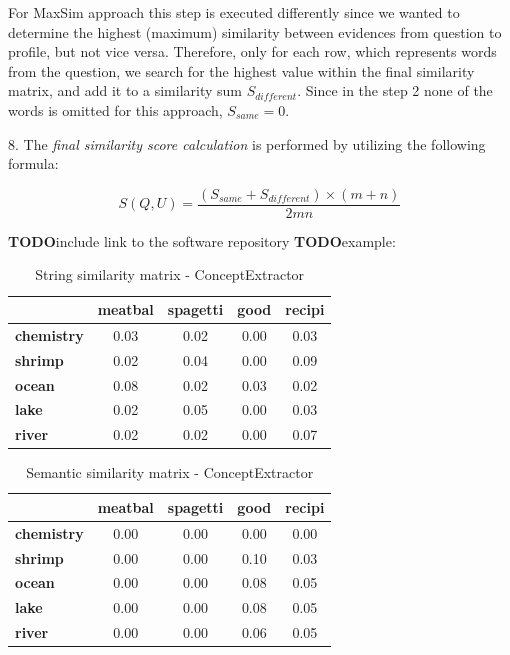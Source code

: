 \documentclass[conference]{IEEEtran}
\newcommand{\TODO}[0]{{\color{BrickRed}\textbf{TODO}}}
\begin{document}
For MaxSim approach this step is executed differently since we wanted to determine the highest (maximum) similarity between evidences from question to profile, but not vice versa. Therefore, only for each row, which represents words from the question, we search for the highest value within the final similarity matrix, and add it to a similarity sum $S_{different}$. Since in the step 2 none of the words is omitted for this approach, $S_{same}=0$.
 
8. The {\it final similarity score calculation} is performed by utilizing the following formula:
 
 \begin{equation}
	\label{eq:s}
	S(Q,U) = \frac{(S_{same}+S_{different})\times (m+n)}{2mn}
\end{equation}
	
	\TODO include link to the software repository
	\TODO example:
	

	
\begin{table}[!t]
\renewcommand{\arraystretch}{1.3}
	\caption{String similarity matrix - ConceptExtractor}
	\label{tab:stringsim}
	\centering
	\begin{tabular}{l||c|c|c|c}\hline
	&\bfseries meatbal & \bfseries spagetti & \bfseries good & \bfseries recipi \\\hline\hline
		\bfseries chemistry & 0.03 & 0.02 & 0.00 & 0.03\\
		\bfseries shrimp & 0.02 & 0.04 & 0.00 & 0.09\\
		\bfseries ocean & 0.08 & 0.02 & 0.03 & 0.02\\
		\bfseries lake & 0.02 & 0.05 & 0.00 & 0.03\\
		\bfseries river & 0.02 & 0.02 & 0.00 & 0.07\\
	\hline
	\end{tabular}
\end{table}

\begin{table}[!t]
\renewcommand{\arraystretch}{1.3}
	\caption{Semantic similarity matrix - ConceptExtractor}
	\label{tab:semsimm}
	\centering
	\begin{tabular}{l||c|c|c|c}\hline
	&\bfseries meatbal & \bfseries spagetti & \bfseries good & \bfseries recipi \\\hline\hline
		\bfseries chemistry & 0.00 & 0.00 & 0.00 & 0.00\\
		\bfseries shrimp & 0.00 & 0.00 & 0.10 & 0.03\\
		\bfseries ocean & 0.00 & 0.00 & 0.08 & 0.05\\
		\bfseries lake & 0.00 & 0.00 & 0.08 & 0.05\\
		\bfseries river & 0.00 & 0.00 & 0.06 & 0.05\\
	\hline
	\end{tabular}
\end{table}
\end{document}
